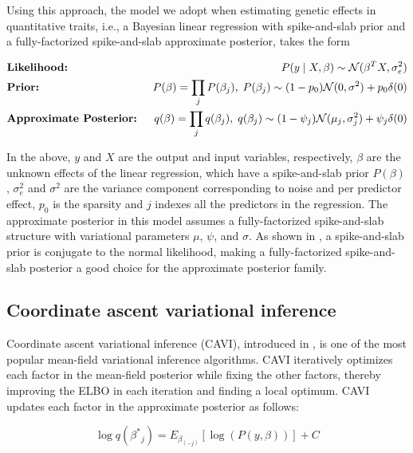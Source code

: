 %
Using this approach, the model we adopt when estimating genetic effects in quantitative traits, i.e., a Bayesian linear regression with spike-and-slab prior and a fully-factorized spike-and-slab approximate posterior, takes the form

\begin{align}
    &\text{\textbf{Likelihood:} } &P(y \mid X, \beta) \sim \mathcal{N}(\beta^T X, \sigma_e^2) \nonumber \\
    &\text{\textbf{Prior:} } &P(\beta) = \prod_j P(\beta_j), \hspace{1mm} P(\beta_j) \sim (1-p_0)\mathcal{N} (0, \sigma ^ 2) + p_0 \delta(0) \nonumber \\
    &\text{\textbf{Approximate Posterior:} } &q(\beta) = \prod_j q(\beta_j), \hspace{1mm} q(\beta_j) \sim (1-\psi_j)\mathcal{N}(\mu_j, \sigma^2_j) + \psi_j \delta(0)
    \label{spike-and-slab-model}
\end{align}

In the above, $y$ and $X$ are the output and input variables, respectively, $\beta$ are the unknown effects of the linear regression, which have a spike-and-slab prior $P(\beta)$, $\sigma_e^2$ and $\sigma^2$ are the variance component corresponding to noise and per predictor effect, $p_0$ is the sparsity and $j$ indexes all the predictors in the regression.
%
The approximate posterior in this model assumes a fully-factorized spike-and-slab structure with variational parameters $\mu$, $\psi$, and $\sigma$.
%
As shown in \cite{spence2020flexible}, a spike-and-slab prior is conjugate to the normal likelihood, making a fully-factorized spike-and-slab posterior a good choice for the approximate posterior family. 

\subsection{Coordinate ascent variational inference}
Coordinate ascent variational inference (CAVI), introduced in \cite{bishop2006pattern}, is one of the most popular mean-field variational inference algorithms.
%
CAVI iteratively optimizes each factor in the mean-field posterior while fixing the other factors, thereby improving the ELBO in each iteration and finding a local optimum.
%
CAVI updates each factor in the approximate posterior as follows:

\begin{equation}
    \log q(\beta^{*}{_j}) = E_{\beta_{(-j)}} [\log(P(y, \beta))] + C \label{cavi}
\end{equation}

